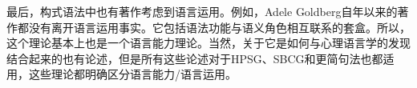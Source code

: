 
最后，构式语法中也有著作考虑到语言运用。例如，Adele Goldberg自\citeyear{Goldberg95a}年以来的著作都没有离开语言运用事实。它包括语法功能与语义角色相互联系的套盒。所以，这个理论基本上也是一个语言能力理论。当然，关于它是如何与心理语言学的发现结合起来的也有论述，但是所有这些论述对于HPSG、SBCG和更简句法\citep[]{Jackendoff2011a}也都适用，这些理论都明确区分语言能力/语言运用。

